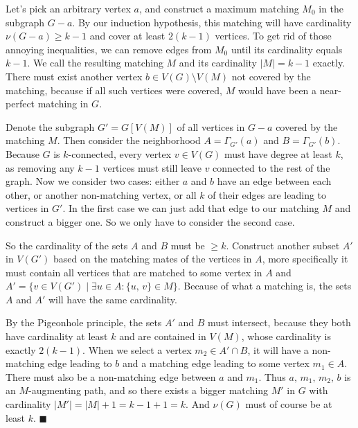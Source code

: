\documentclass{article}
\begin{document}
  Let's pick an arbitrary vertex $a$, and construct a maximum matching $M_0$ in the subgraph $G - a$.
  By our induction hypothesis,
  this matching will have cardinality $\nu(G - a) \geq k-1$ and cover at least $2(k-1)$ vertices.
  To get rid of those annoying inequalities, we can remove edges from $M_0$ until its cardinality equals $k-1$.
  We call the resulting matching $M$ and its cardinality $|M| = k-1$ exactly.
  There must exist another vertex $b \in V(G) \setminus V(M)$ not covered by the matching,
  because if all such vertices were covered, $M$ would have been a near-perfect matching in $G$.

  Denote the subgraph $G' = G[V(M)]$ of all vertices in $G - a$ covered by the matching $M$.
  Then consider the neighborhood $A = \Gamma_{G'}(a)$ and $B = \Gamma_{G'}(b)$.
  Because $G$ is $k$-connected, every vertex $v \in V(G)$ must have degree at least $k$,
  as removing any $k-1$ vertices must still leave $v$ connected to the rest of the graph.
  Now we consider two cases: either $a$ and $b$ have an edge between each other, or another non-matching vertex, or all $k$ of their edges are leading to vertices in $G'$.
  In the first case we can just add that edge to our matching $M$ and construct a bigger one.
  So we only have to consider the second case.

  So the cardinality of the sets $A$ and $B$ must be $\geq k$.
  Construct another subset $A'$ in $V(G')$ based on the matching mates of the vertices in $A$,
  more specifically it must contain all vertices that are matched to some vertex in $A$
  and $A' = \{v \in V(G') \mid \exists u \in A : \{u,\, v\} \in M\}$.
  Because of what a matching is, the sets $A$ and $A'$ will have the same cardinality.

  By the Pigeonhole principle, the sets $A'$ and $B$ must intersect,
  because they both have cardinality at least $k$ and are contained in $V(M)$,
  whose cardinality is exactly $2(k-1)$.
  When we select a vertex $m_2 \in A' \cap B$, it will have a non-matching edge leading to $b$
  and a matching edge leading to some vertex $m_1 \in A$.
  There must also be a non-matching edge between $a$ and $m_1$.
  Thus $a,\, m_1,\, m_2,\, b$ is an $M$-augmenting path,
  and so there exists a bigger matching $M'$ in $G$ with cardinality $|M'| = |M|+1 = k-1+1 = k$.
  And $\nu(G)$ must of course be at least $k$.
  $\blacksquare$

\end{document}
